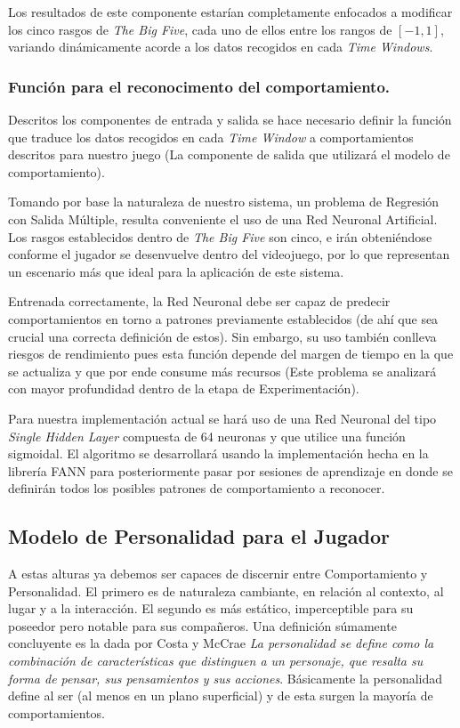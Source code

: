 \documentclass[conference]{IEEEtran}
\begin{document}
Los resultados de este componente estarían completamente enfocados a modificar los cinco rasgos de \textit{The Big Five}, cada uno de ellos entre los rangos de $[-1, 1]$, variando dinámicamente acorde a los datos recogidos en cada \textit{Time Windows}.

\medskip
\subsubsection{Función para el reconocimento del comportamiento.}

Descritos los componentes de entrada y salida se hace necesario definir la función que traduce los datos recogidos en cada \textit{Time Window} a comportamientos descritos para nuestro juego (La componente de salida que utilizará el modelo de comportamiento). 

Tomando por base la naturaleza de nuestro sistema, un problema de Regresión con Salida Múltiple, resulta conveniente el uso de una Red Neuronal Artificial. Los rasgos establecidos dentro de \textit{The Big Five} son cinco, e irán obteniéndose conforme el jugador se desenvuelve dentro del videojuego, por lo que representan un escenario más que ideal para la aplicación de este sistema.

Entrenada correctamente, la Red Neuronal debe ser capaz de predecir comportamientos en torno a patrones previamente establecidos (de ahí que sea crucial una correcta definición de estos). Sin embargo, su uso también conlleva riesgos de rendimiento pues esta función depende del margen de tiempo en la que se actualiza y que por ende consume más recursos (Este problema se analizará con mayor profundidad dentro de la etapa de Experimentación).

Para nuestra implementación actual se hará uso de una Red Neuronal del tipo \textit{Single Hidden Layer} compuesta de 64 neuronas y que utilice una función sigmoidal. El algoritmo se desarrollará usando la implementación hecha en la librería FANN para posteriormente pasar por sesiones de aprendizaje en donde se definirán todos los posibles patrones de comportamiento a reconocer. 	

\subsection{Modelo de Personalidad para el Jugador}

A estas alturas ya debemos ser capaces de discernir entre Comportamiento y Personalidad.  El primero es de naturaleza cambiante, en relación al contexto, al lugar y a la interacción. El segundo es más estático, imperceptible para su poseedor pero notable para sus compañeros. Una definición súmamente concluyente es la dada por Costa y McCrae \citep{mccrae1997personality} \textit{La personalidad se define como la combinación de características que distinguen a un personaje, que resalta su forma de pensar, sus pensamientos y sus acciones}. Básicamente la personalidad define al ser (al menos en un plano superficial) y de esta surgen la mayoría de comportamientos.
\end{document}
